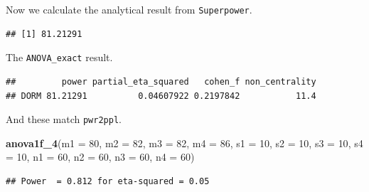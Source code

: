 \documentclass[]{book}
\newenvironment{Shaded}{\begin{snugshade}}{\end{snugshade}}
\newcommand{\DataTypeTok}[1]{\textcolor[rgb]{0.13,0.29,0.53}{#1}}
\newcommand{\DecValTok}[1]{\textcolor[rgb]{0.00,0.00,0.81}{#1}}
\newcommand{\KeywordTok}[1]{\textcolor[rgb]{0.13,0.29,0.53}{\textbf{#1}}}
\newcommand{\NormalTok}[1]{#1}
\newcommand{\OperatorTok}[1]{\textcolor[rgb]{0.81,0.36,0.00}{\textbf{#1}}}
\newcommand{\OtherTok}[1]{\textcolor[rgb]{0.56,0.35,0.01}{#1}}
\newcommand{\StringTok}[1]{\textcolor[rgb]{0.31,0.60,0.02}{#1}}
\begin{document}
Now we calculate the analytical result from \texttt{Superpower}.

\begin{Shaded}
\end{Shaded}

\begin{verbatim}
## [1] 81.21291
\end{verbatim}

The \texttt{ANOVA\_exact} result.

\begin{Shaded}
\end{Shaded}

\begin{verbatim}
##         power partial_eta_squared   cohen_f non_centrality
## DORM 81.21291          0.04607922 0.2197842           11.4
\end{verbatim}

And these match \texttt{pwr2ppl}.

\begin{Shaded}
\begin{Highlighting}[]
\KeywordTok{anova1f_4}\NormalTok{(}\DataTypeTok{m1 =} \DecValTok{80}\NormalTok{, }\DataTypeTok{m2 =} \DecValTok{82}\NormalTok{, }\DataTypeTok{m3 =} \DecValTok{82}\NormalTok{, }\DataTypeTok{m4 =} \DecValTok{86}\NormalTok{,}
          \DataTypeTok{s1 =} \DecValTok{10}\NormalTok{, }\DataTypeTok{s2 =} \DecValTok{10}\NormalTok{, }\DataTypeTok{s3 =} \DecValTok{10}\NormalTok{, }\DataTypeTok{s4 =} \DecValTok{10}\NormalTok{,}
          \DataTypeTok{n1 =} \DecValTok{60}\NormalTok{, }\DataTypeTok{n2 =} \DecValTok{60}\NormalTok{, }\DataTypeTok{n3 =} \DecValTok{60}\NormalTok{, }\DataTypeTok{n4 =} \DecValTok{60}\NormalTok{)}
\end{Highlighting}
\end{Shaded}

\begin{verbatim}
## Power  = 0.812 for eta-squared = 0.05
\end{verbatim}
\end{document}
